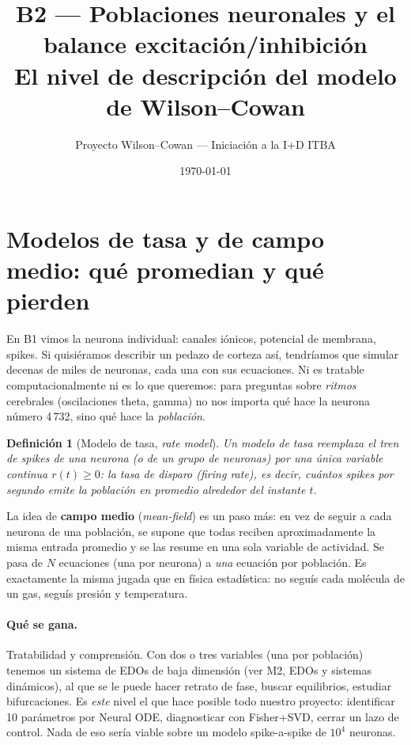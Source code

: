\documentclass[11pt,a4paper]{article}
\title{\textbf{B2 --- Poblaciones neuronales y el balance excitación/inhibición}\\[2pt]\large El nivel de descripción del modelo de Wilson--Cowan}
\author{Proyecto Wilson--Cowan --- Iniciación a la I+D ITBA}
\date{\today}
\newtheorem{definition}{Definición}
\begin{document}
\maketitle
\tableofcontents
\bigskip

\section{Modelos de tasa y de campo medio: qué promedian y qué pierden}

En B1 vimos la neurona individual: canales iónicos, potencial de membrana, spikes. Si quisiéramos describir un pedazo de corteza así, tendríamos que simular decenas de miles de neuronas, cada una con sus ecuaciones. Ni es tratable computacionalmente ni es lo que queremos: para preguntas sobre \emph{ritmos} cerebrales (oscilaciones theta, gamma) no nos importa qué hace la neurona número 4\,732, sino qué hace la \emph{población}.

\begin{definition}[Modelo de tasa, \emph{rate model}]
Un modelo de tasa reemplaza el tren de spikes de una neurona (o de un grupo de neuronas) por una única variable continua $r(t)\ge 0$: la \emph{tasa de disparo} (\emph{firing rate}), es decir, cuántos spikes por segundo emite la población en promedio alrededor del instante $t$.
\end{definition}

La idea de \textbf{campo medio} (\emph{mean-field}) es un paso más: en vez de seguir a cada neurona de una población, se supone que todas reciben aproximadamente la misma entrada promedio y se las resume en una sola variable de actividad. Se pasa de $N$ ecuaciones (una por neurona) a \emph{una} ecuación por población. Es exactamente la misma jugada que en física estadística: no seguís cada molécula de un gas, seguís presión y temperatura.

\paragraph{Qué se gana.} Tratabilidad y comprensión. Con dos o tres variables (una por población) tenemos un sistema de EDOs de baja dimensión (ver M2, EDOs y sistemas dinámicos), al que se le puede hacer retrato de fase, buscar equilibrios, estudiar bifurcaciones. Es \emph{este} nivel el que hace posible todo nuestro proyecto: identificar 10 parámetros por Neural ODE, diagnosticar con Fisher+SVD, cerrar un lazo de control. Nada de eso sería viable sobre un modelo spike-a-spike de $10^4$ neuronas.
\end{document}
